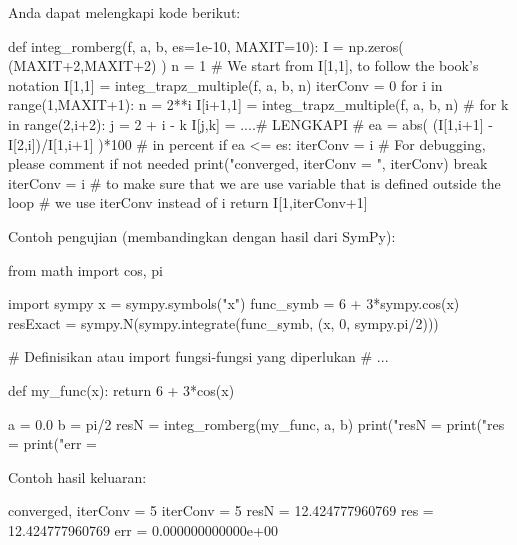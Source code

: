 Anda dapat melengkapi kode berikut:
\begin{pythoncode}
def integ_romberg(f, a, b, es=1e-10, MAXIT=10):
    I = np.zeros( (MAXIT+2,MAXIT+2) )
    n = 1
    # We start from I[1,1], to follow the book's notation
    I[1,1] = integ_trapz_multiple(f, a, b, n)
    iterConv = 0
    for i in range(1,MAXIT+1):
        n = 2**i
        I[i+1,1] = integ_trapz_multiple(f, a, b, n)
        #
        for k in range(2,i+2):
            j = 2 + i - k
            I[j,k] = ....# LENGKAPI
        #
        ea = abs( (I[1,i+1] - I[2,i])/I[1,i+1] )*100 # in percent
        if ea <= es:
            iterConv = i
            # For debugging, please comment if not needed
            print("converged, iterConv = ", iterConv)
            break
        iterConv = i
    # to make sure that we are use variable that is defined outside the loop
    # we use iterConv instead of i
    return I[1,iterConv+1]
\end{pythoncode}

Contoh pengujian (membandingkan dengan hasil dari SymPy):
\begin{pythoncode}
from math import cos, pi

import sympy
x = sympy.symbols("x")
func_symb = 6 + 3*sympy.cos(x)
resExact = sympy.N(sympy.integrate(func_symb, (x, 0, sympy.pi/2)))

# Definisikan atau import fungsi-fungsi yang diperlukan
# ...
    
def my_func(x):
    return 6 + 3*cos(x)
    
a = 0.0
b = pi/2
resN = integ_romberg(my_func, a, b)
print("resN = %
print("res  = %
print("err  = %
\end{pythoncode}

Contoh hasil keluaran:
\begin{textcode}
converged, iterConv =  5
iterConv =  5
resN =    12.424777960769
res  =    12.424777960769
err  = 0.000000000000e+00    
\end{textcode}

